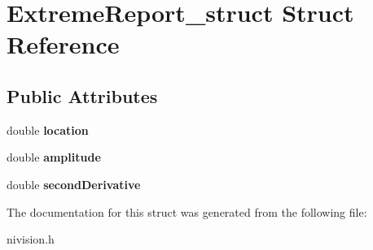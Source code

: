 \hypertarget{structExtremeReport__struct}{
\section{ExtremeReport\_\-struct Struct Reference}
\label{structExtremeReport__struct}
}
\subsection*{Public Attributes}
\begin{DoxyCompactItemize}
\item 
\hypertarget{structExtremeReport__struct_a549df186c5fda90d06abef6849daee2d}{
double {\bfseries location}}
\label{structExtremeReport__struct_a549df186c5fda90d06abef6849daee2d}

\item 
\hypertarget{structExtremeReport__struct_a5cacd498328984d1a2017539f6edb097}{
double {\bfseries amplitude}}
\label{structExtremeReport__struct_a5cacd498328984d1a2017539f6edb097}

\item 
\hypertarget{structExtremeReport__struct_a8387792d1f0bcb18aad85cf7728df9bb}{
double {\bfseries secondDerivative}}
\label{structExtremeReport__struct_a8387792d1f0bcb18aad85cf7728df9bb}

\end{DoxyCompactItemize}


The documentation for this struct was generated from the following file:\begin{DoxyCompactItemize}
\item 
nivision.h\end{DoxyCompactItemize}
